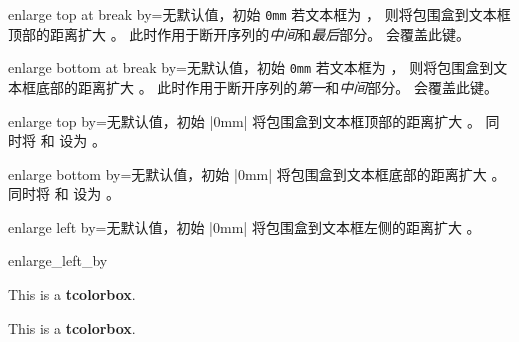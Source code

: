 \clearpage


\begin{docTcbKey}{enlarge top at break by}{=}{无默认值，初始 \texttt{0mm}}
  若文本框为 ，
  则将包围盒到文本框顶部的距离扩大 。
  此时作用于断开序列的\emph{中间}和\emph{最后}部分。
   会覆盖此键。
\end{docTcbKey}


\begin{docTcbKey}{enlarge bottom at break by}{=}{无默认值，初始 \texttt{0mm}}
  若文本框为 ，
  则将包围盒到文本框底部的距离扩大 。
  此时作用于断开序列的\emph{第一}和\emph{中间}部分。
   会覆盖此键。
\end{docTcbKey}


\begin{docTcbKey}{enlarge top by}{=}{无默认值，初始 |0mm|}
  将包围盒到文本框顶部的距离扩大 。
  同时将  和 
  设为 。
\end{docTcbKey}


\begin{docTcbKey}{enlarge bottom by}{=}{无默认值，初始 |0mm|}
  将包围盒到文本框底部的距离扩大 。
  同时将  和 
  设为 。
\end{docTcbKey}


\begin{docTcbKey}{enlarge left by}{=}{无默认值，初始 |0mm|}
  将包围盒到文本框左侧的距离扩大 。
\begin{exdispExample}[safety=2cm]{enlarge_left_by}

\begin{tcolorbox}[enlarge left by=2cm,width=5cm,enhanced,show bounding box]
This is a \textbf{tcolorbox}.
\end{tcolorbox}
\begin{tcolorbox}[enlarge left by=-2cm,width=\linewidth+2cm]
This is a \textbf{tcolorbox}.
\end{tcolorbox}
\end{exdispExample}
\end{docTcbKey}

